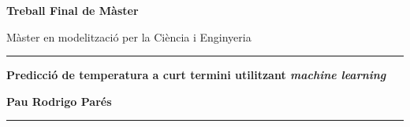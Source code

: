 \documentclass[../main.tex]{subfiles}
\begin{document}

\begin{titlepage}
    \centering
    \vspace*{2cm}

    {\Huge \bfseries Treball Final de Màster\par}
    \vspace{0.5cm}
    {\LARGE Màster en modelització per la Ciència i Enginyeria\par}

    \vfill

    \noindent\rule{\textwidth}{1pt}\par
    \vspace{0.5cm}
      {\Huge \bfseries Predicció de temperatura a curt termini utilitzant \textit{machine learning} \par}
    \vspace{0.5cm}
    {\LARGE \textbf{Pau Rodrigo Parés}\par}
    \vspace{0.5cm}
    \noindent\rule{\textwidth}{1pt}\par

    \vspace{1.5cm}


\end{titlepage}
\end{document}
